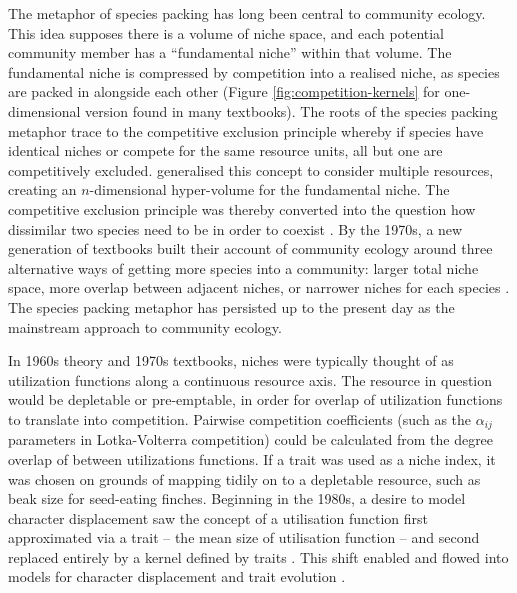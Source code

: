 \documentclass[a4paper,11pt]{article}
\begin{document}
The metaphor of species packing has long been central to community
ecology.  This idea supposes there is a volume of niche space, and
each potential community member has a ``fundamental niche'' within
that volume.  The fundamental niche is compressed by competition into
a realised niche, as species are packed in alongside each other
(Figure \ref{fig:competition-kernels} for one-dimensional version
found in many textbooks).
%
The roots of the species packing metaphor trace to the competitive
exclusion principle \citep{Lotka-1925, Volterra-1926, Gause-1934}
whereby if species have identical niches or compete for the same resource
units, all but one are competitively excluded.
\citet{Hutchinson-1957} generalised this concept to consider multiple
resources, creating an $n$-dimensional hyper-volume for the fundamental
niche.
%
The competitive exclusion principle was thereby converted into the
question how dissimilar two species need to be in order to coexist
\citep{MacArthur-1967, Slatkin-1980}.
%
By the 1970s, a new generation of textbooks built their account of
community ecology around three alternative ways of getting more
species into a community: larger total niche space, more overlap
between adjacent niches, or narrower niches for each species
\citep{Whittaker-1970,Krebs-1972,Ricklefs-1973,Pianka-1974}. The
species packing metaphor has persisted up to the present day as the
mainstream approach to community ecology.

In 1960s theory and 1970s textbooks, niches were typically thought of
as utilization functions along a continuous resource axis. The
resource in question would be depletable or pre-emptable, in order for
overlap of utilization functions to translate into
competition. Pairwise competition coefficients (such as the
$\alpha_{ij}$ parameters in Lotka-Volterra competition) could be
calculated from the degree overlap of between utilizations functions.
If a trait was used as a niche index, it was chosen on grounds of
mapping tidily on to a depletable resource, such as beak size for
seed-eating finches. Beginning in the 1980s, a desire to model
character displacement saw the concept of a utilisation function first
approximated via a trait -- the mean size of utilisation function
\citep {Roughgarden-1979} -- and second replaced entirely by a kernel
defined by traits \citep{Slatkin-1980,Taper-1985}. This shift enabled
and flowed into models for character displacement
\citep[e.g.,][]{Taper-1985, Case-2000, Goldberg-2006} and trait
evolution \citep{Brown-1987,Geritz-1998,Geritz-1999,Dieckmann-1999,
  Abrams-2001}.
\end{document}
